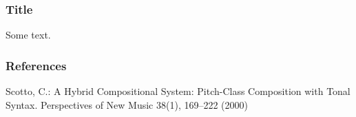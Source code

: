 
\begin{frame}
\frametitle{Title}
\begin{example}
Some text.
\end{example}
\end{frame}

\begin{frame}[allowframebreaks]
\frametitle{References}
\footnotesize{\begin{thebibliography}{1}
 Scotto, C.: A Hybrid Compositional System: Pitch-Class Composition with Tonal Syntax. Perspectives of New Music 38(1), 169--222 (2000)
\end{thebibliography}}
\end{frame}
